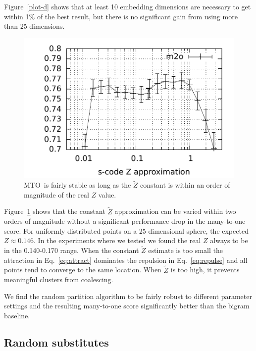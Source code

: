 \documentclass[11pt]{article}
\newcommand{\mto}{\mbox{MTO }}
\begin{document}
Figure~\ref{plot-d} shows that at least 10 embedding dimensions are
necessary to get within 1\% of the best result, but there is no
significant gain from using more than 25 dimensions.

\begin{figure}[ht] \centering
\includegraphics[width=\linewidth]{plot-z.pdf}
\caption{\mto is fairly stable as long as the $\tilde{Z}$ constant is
  within an order of magnitude of the real $Z$ value.}
\label{plot-z}
\end{figure}

Figure~\ref{plot-z} shows that the constant $\tilde{Z}$ approximation
can be varied within two orders of magnitude without a significant
performance drop in the many-to-one score.  For uniformly distributed
points on a 25 dimensional sphere, the expected $Z\approx 0.146$.  In
the experiments where we tested we found the real $Z$ always to be in
the 0.140-0.170 range.  When the constant $\tilde{Z}$ estimate is too
small the attraction in Eq.~\ref{eq:attract} dominates the repulsion
in Eq.~\ref{eq:repulse} and all points tend to converge to the same
location.  When $\tilde{Z}$ is too high, it prevents meaningful
clusters from coalescing.

We find the random partition algorithm to be fairly robust to different
parameter settings and the resulting many-to-one score significantly
better than the bigram baseline.

\subsection{Random substitutes}\label{sec:wordsub}
\end{document}
